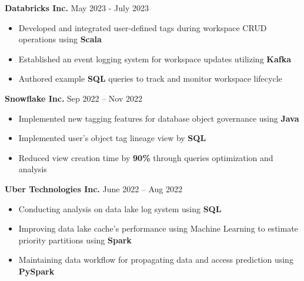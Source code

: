 \documentclass[11pt]{article}
\begin{document}
\hspace{10pt}\textbf{Databricks Inc.} \hfill {\small May 2023 - July 2023} \\
  \vspace{-2pt}
  \begin{itemize}[leftmargin=31pt]
  \vspace{-10pt}
    \setlength\itemsep{-5pt}
    \item {\small Developed and integrated user-defined tags during workspace CRUD operations using \textbf{Scala}}
    \item {\small Established an event logging system for workspace updates utilizing \textbf{Kafka}}
    \item {\small Authored example \textbf{SQL} queries to track and monitor workspace lifecycle}
    \vspace{-7pt}
  \end{itemize}

\hspace{10pt}\textbf{Snowflake Inc.} \hfill {\small Sep 2022 -- Nov 2022} \\
  \vspace{-2pt}
  \begin{itemize}[leftmargin=31pt]
    \vspace{-10pt}
    \setlength\itemsep{-5pt}
    \item {\small Implemented new tagging features for database object governance using \textbf{Java}}
    \item {\small Implemented user's object tag lineage view by \textbf{SQL}}
    \item {\small Reduced view creation time by \textbf{90\%} through queries optimization and analysis}
    \vspace{-7pt}
  \end{itemize}

\hspace{10pt}\textbf{Uber Technologies Inc.} \hfill {\small June 2022 -- Aug 2022} \\
  \vspace{-2pt}
  \begin{itemize}[leftmargin=31pt]
    \vspace{-10pt}
    \setlength\itemsep{-5pt}
    \item {\small Conducting analysis on data lake log system using \textbf{SQL}}
    \item {\small Improving data lake cache's performance using Machine Learning to estimate priority partitions using \textbf{Spark}}
    \item {\small Maintaining data workflow for propagating data and access prediction using \textbf{PySpark}}
    \vspace{-7pt}
  \end{itemize}
\end{document}
